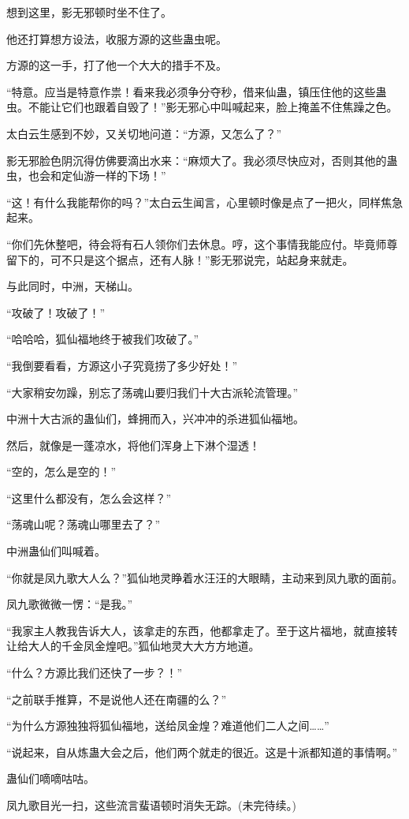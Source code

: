 \begin{this_body}
想到这里，影无邪顿时坐不住了。

他还打算想方设法，收服方源的这些蛊虫呢。

方源的这一手，打了他一个大大的措手不及。

“特意。应当是特意作祟！看来我必须争分夺秒，借来仙蛊，镇压住他的这些蛊虫。不能让它们也跟着自毁了！”影无邪心中叫喊起来，脸上掩盖不住焦躁之色。

太白云生感到不妙，又关切地问道：“方源，又怎么了？”

影无邪脸色阴沉得仿佛要滴出水来：“麻烦大了。我必须尽快应对，否则其他的蛊虫，也会和定仙游一样的下场！”

“这！有什么我能帮你的吗？”太白云生闻言，心里顿时像是点了一把火，同样焦急起来。

“你们先休整吧，待会将有石人领你们去休息。哼，这个事情我能应付。毕竟师尊留下的，可不只是这个据点，还有人脉！”影无邪说完，站起身来就走。

与此同时，中洲，天梯山。

“攻破了！攻破了！”

“哈哈哈，狐仙福地终于被我们攻破了。”

“我倒要看看，方源这小子究竟捞了多少好处！”

“大家稍安勿躁，别忘了荡魂山要归我们十大古派轮流管理。”

中洲十大古派的蛊仙们，蜂拥而入，兴冲冲的杀进狐仙福地。

然后，就像是一蓬凉水，将他们浑身上下淋个湿透！

“空的，怎么是空的！”

“这里什么都没有，怎么会这样？”

“荡魂山呢？荡魂山哪里去了？”

中洲蛊仙们叫喊着。

“你就是凤九歌大人么？”狐仙地灵睁着水汪汪的大眼睛，主动来到凤九歌的面前。

凤九歌微微一愣：“是我。”

“我家主人教我告诉大人，该拿走的东西，他都拿走了。至于这片福地，就直接转让给大人的千金凤金煌吧。”狐仙地灵大大方方地道。

“什么？方源比我们还快了一步？！”

“之前联手推算，不是说他人还在南疆的么？”

“为什么方源独独将狐仙福地，送给凤金煌？难道他们二人之间……”

“说起来，自从炼蛊大会之后，他们两个就走的很近。这是十派都知道的事情啊。”

蛊仙们嘀嘀咕咕。

凤九歌目光一扫，这些流言蜚语顿时消失无踪。(未完待续。)

\end{this_body}

